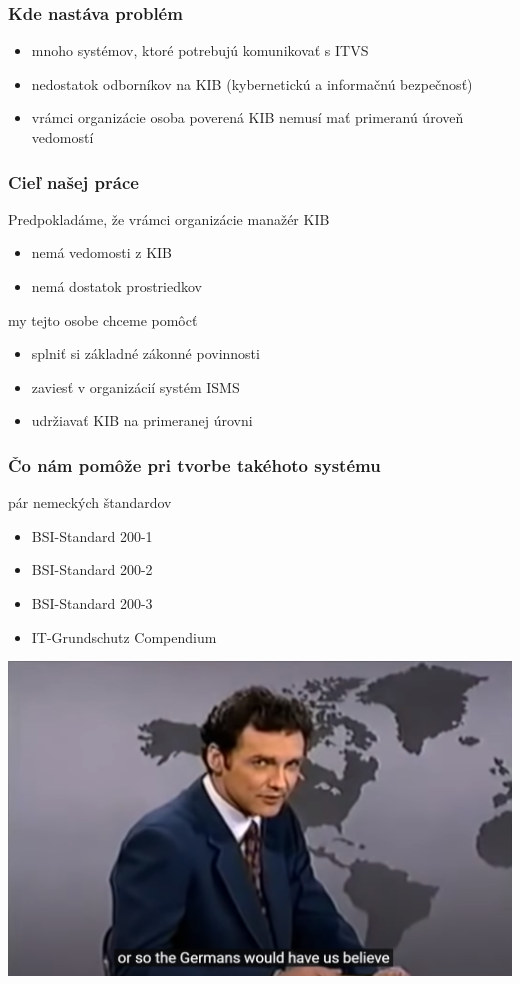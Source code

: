 \documentclass{beamer}
\begin{document}
\begin{frame}
    \frametitle{Kde nastáva problém}
    \begin{itemize}
        \item mnoho systémov, ktoré potrebujú komunikovať s ITVS
        \item nedostatok odborníkov na KIB (kybernetickú a informačnú bezpečnosť)
        \item vrámci organizácie osoba poverená KIB nemusí mať primeranú úroveň vedomostí
    \end{itemize}
\end{frame}
\begin{frame}
    \frametitle{Cieľ našej práce}
    Predpokladáme, že vrámci organizácie manažér KIB
    \begin{itemize}
        \item nemá vedomosti z KIB
        \item nemá dostatok prostriedkov
    \end{itemize}
    my tejto osobe chceme pomôcť
    \begin{itemize}
        \item splniť si základné zákonné povinnosti
        \item zaviesť v organizácií systém ISMS
        \item udržiavať KIB na primeranej úrovni
    \end{itemize}
\end{frame}
\begin{frame}
    \frametitle{Čo nám pomôže pri tvorbe takéhoto systému}
    pár nemeckých štandardov
    \begin{itemize}
        \item BSI-Standard 200-1
        \item BSI-Standard 200-2
        \item BSI-Standard 200-3
        \item IT-Grundschutz Compendium
    \end{itemize}
\end{frame}
\begin{frame}
        \includegraphics[width=\textwidth,height=\textheight,keepaspectratio]{./germans.png}
\end{frame}
\end{document}
